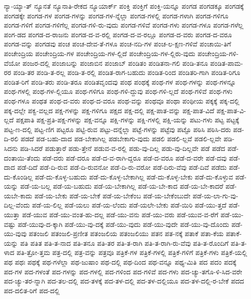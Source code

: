 {ನ್ಯಾ-ಯ್ಯಾ-ತ್
ನ್ಯೂನತೆ
ನ್ಯೂನಾತಿ-ರೇಕದ
ನ್ಯೂಯಾರ್ಕ್
ಪಂಕ್ತಿ
ಪಂಕ್ತಿಗೆ
ಪಂಕ್ತಿ-ಯನ್ನೂ
ಪಂಗಡ
ಪಂಗಡಕ್ಕೂ
ಪಂಗಡಕ್ಕೆ
ಪಂಗಡಕ್ಕೇ
ಪಂಗಡ-ಗಳ
ಪಂಗಡ-ಗಳನ್ನು
ಪಂಗಡ-ಗಳ-ನ್ನೆಲ್ಲಾ
ಪಂಗಡ-ಗಳಲ್ಲಿ
ಪಂಗಡ-ಗಳಾಗಿ
ಪಂಗಡ-ಗಳಿಗೂ
ಪಂಗಡ-ಗಳಿಗೆ
ಪಂಗಡ-ಗಳಿಗೆಲ್ಲ
ಪಂಗಡ-ಗಳಿ-ರು-ವುದು
ಪಂಗಡ-ಗಳಿವೆ
ಪಂಗಡ-ಗಳು
ಪಂಗಡ-ಗಳೂ
ಪಂಗಡ-ಗಳೆಲ್ಲ
ಪಂಗ-ಡದ
ಪಂಗಡ-ದ-ರಾಜನು
ಪಂಗಡ-ದ-ವ-ರಲ್ಲಿ
ಪಂಗಡ-ದ-ವ-ರಲ್ಲೂ
ಪಂಗಡ-ದ-ವರು
ಪಂಗಡ-ದ-ವರೂ
ಪಂಗಡ-ವನ್ನು
ಪಂಗಡವು
ಪಂಚ
ಪಂಚ-ದೇವ-ತೆ-ಗಳೂ
ಪಂಚ-ನದಿ-ಗಳ
ಪಂಚ-ಲ-ಕ್ಷಣ-ಗಳಿವೆ
ಪಂಚಾಯಿ-ತಿಗೆ
ಪಂಚೇಂದ್ರಿಯ
ಪಂಚೇಂದ್ರಿಯ-ಗಳ
ಪಂಚೇಂದ್ರಿಯ-ಗಳ-ಲ್ಲಿದೆ
ಪಂಚೇಂದ್ರಿಯ-ಗಳ-ಲ್ಲಿರು-ವುದು
ಪಂಚೇಂದ್ರಿಯ-ಗಳಿ-ವೆಯೋ
ಪಂಜರ-ದಲ್ಲಿ
ಪಂಜಾಬನ್ನು
ಪಂಜಾಬಿನ
ಪಂಜಾಬ್
ಪಂಡಿತಂ
ಪಂಡಿತನಾ-ಗಲಿ
ಪಂಡಿ-ತನೂ
ಪಂಡಿತ-ಪಾಮ-ರರ
ಪಂಡಿ-ತರ
ಪಂಡಿ-ತ-ರಲ್ಲ
ಪಂಡಿ-ತ-ರಲ್ಲಿ
ಪಂಡಿತ-ರಾಗ-ಬಹುದು
ಪಂಡಿತ-ರಿಂದ
ಪಂಡಿತರಿ-ಗಾಗಿ
ಪಂಡಿತ-ರಿಗೂ
ಪಂಡಿತ-ರಿಗೆ
ಪಂಡಿ-ತರು
ಪಂಡಿ-ತರೂ
ಪಂಡಿತವೃಂದವು
ಪಂಥ
ಪಂಥಕ್ಕೆ
ಪಂಥ-ಗಳ
ಪಂಥ-ಗಳನ್ನು
ಪಂಥ-ಗಳನ್ನೂ
ಪಂಥ-ಗಳಲ್ಲಿ
ಪಂಥ-ಗಳ-ಲ್ಲಿಯೂ
ಪಂಥ-ಗಳಿಗೂ
ಪಂಥ-ಗಳಿ-ದ್ದುವು
ಪಂಥ-ಗಳಿ-ಲ್ಲದೆ
ಪಂಥ-ಗಳಿವೆ
ಪಂಥ-ಗಳು
ಪಂಥ-ಗಳೂ
ಪಂಥತ
ಪಂಥ-ದ-ವರು
ಪಂಥ-ದ-ವರೂ
ಪಂಥ-ವನ್ನು
ಪಂಥವೂ
ಪಂಥಾ
ಪಂಥೀಯ
ಪಕ್ಕಕ್ಕೆ
ಪಕ್ಕ-ದಲ್ಲಿ
ಪಕ್ಕ-ದಲ್ಲೇ
ಪಕ್ವ-ವಲ್ಲದ
ಪಕ್ಷ-ಗಳನ್ನು
ಪಕ್ಷ-ಗಳಿಗೂ
ಪಕ್ಷದ
ಪಕ್ಷ-ದಲ್ಲಿ
ಪಕ್ಷ-ಪಾತ-ವನ್ನು
ಪಕ್ಷ-ಪಾತ-ವಿದೆ
ಪಕ್ಷ-ಪಾತ-ವಿ-ಲ್ಲದೆ
ಪಕ್ಷಪಾತಿ
ಪಕ್ಷ-ಪ್ರತಿ-ಪಕ್ಷ-ಗಳನ್ನು
ಪಕ್ಷ-ವನ್ನೂ
ಪಕ್ಷಿ-ಗಳನ್ನು
ಪಕ್ಷಿ-ಗಳಲ್ಲಿ
ಪಕ್ಷಿ-ಯನ್ನು
ಪಟು-ಗಳು
ಪಟ್ಟ
ಪಟ್ಟಕ್ಕೆ
ಪಟ್ಟ-ಣ-ದಲ್ಲಿ
ಪಟ್ಟ-ಣಿಗ
ಪಟ್ಟರೂ
ಪಟ್ಟಿ-ರುವ
ಪಟ್ಟು-ದನ್ನೆಲ್ಲಾ
ಪಟ್ಟೆ-ಗಳನ್ನು
ಪಟ್ಟೆವು
ಪಟ್ಟೊ
ಪಠಿಸಿ
ಪಠಿಸಿ-ದರು
ಪಡ-ದಿ-ರಲಿ
ಪಡದೆ
ಪಡ-ಬಹು-ದಾದ
ಪಡ-ಬೇಕಾಗಿಲ್ಲ
ಪಡಬೇಕಾಗು-ವುದು
ಪಡಲಿ
ಪಡಲಿ-ಲ್ಲವೆ
ಪಡಲಿ-ಲ್ಲವೇ
ಪಡಿ-ಸಿದನು
ಪಡಿ-ಸಿದರೆ
ಪಡುತ್ತಾರೆ
ಪಡು-ತ್ತೇನೆ
ಪಡುವ-ವ-ರಲ್ಲಿ
ಪಡು-ವು-ದಿಲ್ಲ
ಪಡು-ವು-ದಿಲ್ಲವೇ
ಪಡೆ
ಪಡೆದ
ಪಡೆ-ದಂತಾಯಿ-ತೆಂದು
ಪಡೆ-ದರು
ಪಡೆ-ದರೂ
ಪಡೆ-ದ-ವ-ರಾಗಿ-ದ್ದರೂ
ಪಡೆ-ದ-ವರೂ
ಪಡೆ-ದ-ವರೇ
ಪಡೆ-ದವು
ಪಡೆ-ದಾದ
ಪಡೆ-ದಿದೆ
ಪಡೆ-ದಿ-ರುವ
ಪಡೆ-ದಿ-ರುವನೋ
ಪಡೆ-ದಿ-ರು-ವರೋ
ಪಡೆ-ದಿರು-ವೆವು
ಪಡೆ-ದಿವೆ
ಪಡೆದು
ಪಡೆ-ದು-ಕೊಂಡಿಲ್ಲ
ಪಡೆ-ದು-ಕೊಳ್ಳ-ಬಹುದು
ಪಡೆ-ದು-ಕೊಳ್ಳ-ಬೇಕಾಗಿಲ್ಲ
ಪಡೆ-ದು-ಕೊಳ್ಳ-ಬೇಕು
ಪಡೆ-ದು-ಕೊಳ್ಳುವ
ಪಡೆ-ಯನ್ನು
ಪಡೆ-ಯ-ಬಲ್ಲ
ಪಡೆ-ಯ-ಬಹುದು
ಪಡೆ-ಯ-ಬೇಕಾಗಿಲ್ಲ
ಪಡೆ-ಯ-ಬೇ-ಕಾದ
ಪಡೆ-ಯ-ಬೇ-ಕಾದರೆ
ಪಡೆ-ಯಬೇ-ಕಾದು
ಪಡೆ-ಯ-ಬೇಕು
ಪಡೆ-ಯ-ಬೇಕೆ
ಪಡೆ-ಯ-ಬೇಕೆಂಬ
ಪಡೆ-ಯ-ಬೇಕೆಂಬುದೇ
ಪಡೆ-ಯ-ಲಾ-ಗು-ವು-ದಿಲ್ಲ-ವೆಂದು
ಪಡೆ-ಯ-ಲಿಲ್ಲ
ಪಡೆ-ಯಲು
ಪಡೆ-ಯ-ಲೆಂದು
ಪಡೆ-ಯಲೇ-ಬೇಕು
ಪಡೆ-ಯಿರಿ
ಪಡೆ-ಯು-ತ್ತದೆ
ಪಡೆ-ಯುತ್ತಾ
ಪಡೆ-ಯುವ
ಪಡೆ-ಯು-ವಂತ-ಹು-ದಲ್ಲ
ಪಡೆ-ಯು-ವನು
ಪಡೆ-ಯು-ವರು
ಪಡೆ-ಯುವ-ವ-ರೆಗೆ
ಪಡೆ-ಯು-ವಷ್ಟು
ಪಡೆ-ಯುವು-ದ-ಕ್ಕಾಗಿ
ಪಡೆ-ಯು-ವು-ದಕ್ಕೆ
ಪಡೆ-ಯು-ವುದು
ಪಡೆ-ಯು-ವುದೇ
ಪಡೆ-ಯು-ವು-ದೊಂದು
ಪಡೆ-ಯು-ವುವು
ಪತಂಜಲಿ
ಪತಂಜಲಿ-ಪ್ರಣೀತ
ಪತಂಜಲಿಯ
ಪತಂಜಲಿಯು
ಪತನ
ಪತ-ನಕ್ಕೆ
ಪತಾಕೆ
ಪತಾ-ಕೆಯ
ಪತಾಕೆ-ಯನ್ನು
ಪತಿ
ಪತಿತ
ಪತಿ-ತ-ನಾದ
ಪತಿ-ತನೂ
ಪತಿ-ತರ
ಪತಿ-ತ-ರಾಗಿ
ಪತಿ-ತ-ರಾಗಿ-ರು-ವೆವು
ಪತಿ-ತ-ರೊಂದಿಗೆ
ಪತಿ-ತ-ಳಾದ
ಪತಿ-ತ್ರೋ-ತ್ತಮ
ಪತ್ರ-ದಲ್ಲಿ
ಪತ್ರ-ವನ್ನು
ಪತ್ರವೂ
ಪತ್ರಿಕೆ-ಗಳ
ಪತ್ರಿಕೆ-ಗಳಲ್ಲಿ
ಪತ್ರಿಕೆ-ಗಳಿಗೆ
ಪತ್ರಿಕೆ-ಗಳು
ಪತ್ರಿಕೆ-ಯಲ್ಲಿ
ಪಥ
ಪಥಃ
ಪಥಕ್ಕೆ
ಪಥ-ಗಳೆಲ್ಲಾ
ಪಥ-ಜುಷಾಂ
ಪಥ-ದಲ್ಲಿ
ಪಥ-ದಿಂದ
ಪಥ-ವನ್ನೂ
ಪಥ್ಯ-ಮಿತಿ
ಪದ
ಪದಂ
ಪದಕ್ಕೆ
ಪದ-ಗಳ
ಪದ-ಗಳಂತೆ
ಪದ-ಗಳನ್ನು
ಪದ-ಗಳಲ್ಲಿ
ಪದ-ಗಳಿಂದ
ಪದ-ಗಳಿವೆ
ಪದ-ಗಳು
ಪದ-ಚ್ಯು-ತಗೊ-ಳಿ-ಸಿದ-ವರೇ
ಪದ-ಚ್ಯು-ತರ-ನ್ನಾಗಿ
ಪದ-ತಲ-ದಲ್ಲಿ
ಪದ-ತಳಕ್ಕೆ
ಪದ-ತಳ-ದಲ್ಲಿ
ಪದ-ತಳ-ದಲ್ಲಿಯೂ
ಪದ-ತಳ-ದಲ್ಲಿ-ರ-ಬೇಕೆ
ಪದದ
ಪದ-ದಲಿತ-ರಿಗೆ
ಪದ-ದಲ್ಲಿ
}
